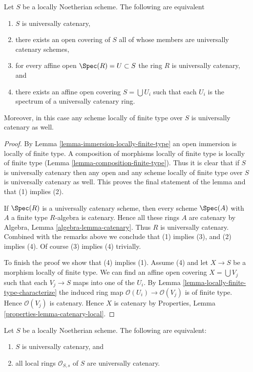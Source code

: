 \begin{lemma}
\label{lemma-universally-catenary-local}
Let $S$ be a locally Noetherian scheme. The following are equivalent
\begin{enumerate}
\item $S$ is universally catenary,
\item there exists an open covering of $S$ all of whose members are
universally catenary schemes,
\item for every affine open $\Spec(R) = U \subset S$ the ring
$R$ is universally catenary, and
\item there exists an affine open covering $S = \bigcup U_i$ such
that each $U_i$ is the spectrum of a universally catenary ring.
\end{enumerate}
Moreover, in this case any scheme locally of finite type over $S$
is universally catenary as well.
\end{lemma}

\begin{proof}
By Lemma \ref{lemma-immersion-locally-finite-type} an open immersion
is locally of finite type. A composition of morphisms locally of
finite type is locally of finite type
(Lemma \ref{lemma-composition-finite-type}). Thus it is clear that if $S$ is
universally catenary then any open and any scheme locally of finite
type over $S$ is universally catenary as well. This proves the final
statement of the lemma and that (1) implies (2).

\medskip\noindent
If $\Spec(R)$ is a universally catenary scheme, then every
scheme $\Spec(A)$ with $A$ a finite type $R$-algebra is
catenary. Hence all these rings $A$ are catenary by
Algebra, Lemma \ref{algebra-lemma-catenary}.
Thus $R$ is universally catenary. Combined with the remarks above we
conclude that (1) implies (3), and (2) implies (4). Of course
(3) implies (4) trivially.

\medskip\noindent
To finish the proof we show that (4) implies (1).
Assume (4) and let $X \to S$ be a morphism locally of finite type.
We can find an affine open covering $X = \bigcup V_j$ such that
each $V_j \to S$ maps into one of the $U_i$. By
Lemma \ref{lemma-locally-finite-type-characterize}
the induced ring map $\mathcal{O}(U_i) \to \mathcal{O}(V_j)$ is
of finite type. Hence $\mathcal{O}(V_j)$ is catenary. Hence
$X$ is catenary by Properties, Lemma \ref{properties-lemma-catenary-local}.
\end{proof}

\begin{lemma}
\label{lemma-universally-catenary-local-rings-universally-catenary}
Let $S$ be a locally Noetherian scheme.
The following are equivalent:
\begin{enumerate}
\item $S$ is universally catenary, and
\item all local rings $\mathcal{O}_{S, s}$ of $S$ are universally catenary.
\end{enumerate}
\end{lemma}

